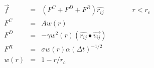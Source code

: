 \documentclass[12pt]{article}
\begin{document}
\begin{eqnarray*}
 \vec{f} & = & (F^C + F^D + F^R) \hat{r_{ij}} \qquad \qquad r < r_c \\
 F^C & = & A w(r) \\
 F^D & = & - \gamma w^2(r) (\hat{r_{ij}} \bullet \vec{v_{ij}}) \\
 F^R & = & \sigma w(r) \alpha (\Delta t)^{-1/2} \\
 w(r) & = & 1 - r/r_c
\end{eqnarray*}                           
\end{document}

